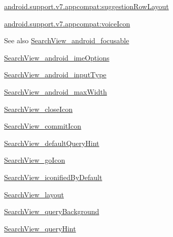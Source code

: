 {\ttfamily \hyperlink{classandroid_1_1support_1_1v7_1_1appcompat_1_1R_1_1styleable_a721bc13b98ace8002519af52fdaf8a26}{android.\+support.\+v7.\+appcompat\+:suggestion\+Row\+Layout}}

{\ttfamily \hyperlink{classandroid_1_1support_1_1v7_1_1appcompat_1_1R_1_1styleable_ab659f692825b4cff1b7e0b64a992de3d}{android.\+support.\+v7.\+appcompat\+:voice\+Icon}}

\begin{DoxySeeAlso}{See also}
\hyperlink{classandroid_1_1support_1_1v7_1_1appcompat_1_1R_1_1styleable_aafdb0651b761f7d79703c2cbdb007eec}{Search\+View\+\_\+android\+\_\+focusable} 

\hyperlink{classandroid_1_1support_1_1v7_1_1appcompat_1_1R_1_1styleable_a532203151aa88d8386a459a3c5a7a355}{Search\+View\+\_\+android\+\_\+ime\+Options} 

\hyperlink{classandroid_1_1support_1_1v7_1_1appcompat_1_1R_1_1styleable_a961ee19122e31cefa5edcf20e27837e0}{Search\+View\+\_\+android\+\_\+input\+Type} 

\hyperlink{classandroid_1_1support_1_1v7_1_1appcompat_1_1R_1_1styleable_a734d834efc9a3afe64b8db664732ff12}{Search\+View\+\_\+android\+\_\+max\+Width} 

\hyperlink{classandroid_1_1support_1_1v7_1_1appcompat_1_1R_1_1styleable_a7325792da95c39bc84bbe457b170676d}{Search\+View\+\_\+close\+Icon} 

\hyperlink{classandroid_1_1support_1_1v7_1_1appcompat_1_1R_1_1styleable_afb59632753076895715c52a281d2ee4e}{Search\+View\+\_\+commit\+Icon} 

\hyperlink{classandroid_1_1support_1_1v7_1_1appcompat_1_1R_1_1styleable_ae4b4d1c44649fd0230d2b11b181d19bd}{Search\+View\+\_\+default\+Query\+Hint} 

\hyperlink{classandroid_1_1support_1_1v7_1_1appcompat_1_1R_1_1styleable_afd493beb8db4436433dc905ac38231a1}{Search\+View\+\_\+go\+Icon} 

\hyperlink{classandroid_1_1support_1_1v7_1_1appcompat_1_1R_1_1styleable_a4dd3091dfa10ff0d05004332a0fbb677}{Search\+View\+\_\+iconified\+By\+Default} 

\hyperlink{classandroid_1_1support_1_1v7_1_1appcompat_1_1R_1_1styleable_ad241a6c289e7efe81bf10167a3969b9a}{Search\+View\+\_\+layout} 

\hyperlink{classandroid_1_1support_1_1v7_1_1appcompat_1_1R_1_1styleable_a4bfbfa40648f5bbab65bd2ad5dc0bd4d}{Search\+View\+\_\+query\+Background} 

\hyperlink{classandroid_1_1support_1_1v7_1_1appcompat_1_1R_1_1styleable_a90f513ff603af9e55eadeff9c70fbbfb}{Search\+View\+\_\+query\+Hint} 


\end{DoxySeeAlso}

